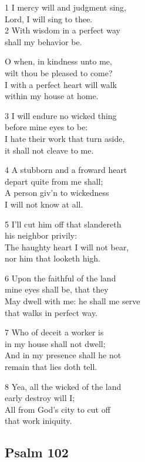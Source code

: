 1 I mercy will and judgment sing,\\
Lord, I will sing to thee.\\
2 With wisdom in a perfect way\\
shall my behavior be.

O when, in kindness unto me,\\
wilt thou be pleased to come?\\
I with a perfect heart will walk\\
within my house at home.

3 I will endure no wicked thing\\
before mine eyes to be:\\
I hate their work that turn aside,\\
it shall not cleave to me.

4 A stubborn and a froward heart\\
depart quite from me shall;\\
A person giv’n to wickedness\\
I will not know at all.

5 I’ll cut him off that slandereth\\
his neighbor privily:\\
The haughty heart I will not bear,\\
nor him that looketh high.

6 Upon the faithful of the land\\
mine eyes shall be, that they\\
May dwell with me: he shall me serve\\
that walks in perfect way.

7 Who of deceit a worker is\\
in my house shall not dwell;\\
And in my presence shall he not\\
remain that lies doth tell.

8 Yea, all the wicked of the land\\
early destroy will I;\\
All from God’s city to cut off\\
that work iniquity.

\begin{center}
\quad{}\quad{}
\end{center}

\subsection*{Psalm 102}

